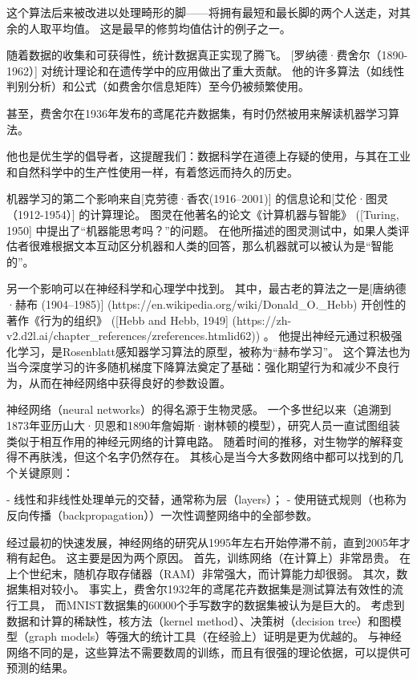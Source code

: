 这个算法后来被改进以处理畸形的脚——将拥有最短和最长脚的两个人送走，对其余的人取平均值。 这是最早的修剪均值估计的例子之一。

随着数据的收集和可获得性，统计数据真正实现了腾飞。 [罗纳德·费舍尔（1890-1962）]
对统计理论和在遗传学中的应用做出了重大贡献。 他的许多算法（如线性判别分析）和公式（如费舍尔信息矩阵）至今仍被频繁使用。 

甚至，费舍尔在1936年发布的鸢尾花卉数据集，有时仍然被用来解读机器学习算法。 

他也是优生学的倡导者，这提醒我们：数据科学在道德上存疑的使用，与其在工业和自然科学中的生产性使用一样，有着悠远而持久的历史。

机器学习的第二个影响来自[克劳德·香农(1916–2001)] %
的信息论和[艾伦·图灵（1912-1954）] %
的计算理论。 图灵在他著名的论文《计算机器与智能》 ([Turing, 1950] %
中提出了“机器能思考吗？”的问题。 在他所描述的图灵测试中，如果人类评估者很难根据文本互动区分机器和人类的回答，那么机器就可以被认为是“智能的”。

另一个影响可以在神经科学和心理学中找到。 其中，最古老的算法之一是[唐纳德·赫布 (1904–1985)]
(https://en.wikipedia.org/wiki/Donald\_O.\_Hebb)
开创性的著作《行为的组织》 ([Hebb and Hebb, 1949]
(https://zh-v2.d2l.ai/chapter\_references/zreferences.htmlid62)) 。
他提出神经元通过积极强化学习，是Rosenblatt感知器学习算法的原型，被称为“赫布学习”。 这个算法也为当今深度学习的许多随机梯度下降算法奠定了基础：强化期望行为和减少不良行为，从而在神经网络中获得良好的参数设置。

神经网络（neural networks）的得名源于生物灵感。 一个多世纪以来（追溯到1873年亚历山大·贝恩和1890年詹姆斯·谢林顿的模型），研究人员一直试图组装类似于相互作用的神经元网络的计算电路。 随着时间的推移，对生物学的解释变得不再肤浅，但这个名字仍然存在。 其核心是当今大多数网络中都可以找到的几个关键原则：

- 线性和非线性处理单元的交替，通常称为层（layers）；
- 使用链式规则（也称为反向传播（backpropagation））一次性调整网络中的全部参数。

经过最初的快速发展，神经网络的研究从1995年左右开始停滞不前，直到2005年才稍有起色。 这主要是因为两个原因。 首先，训练网络（在计算上）非常昂贵。 在上个世纪末，随机存取存储器（RAM）非常强大，而计算能力却很弱。 其次，数据集相对较小。 事实上，费舍尔1932年的鸢尾花卉数据集是测试算法有效性的流行工具， 而MNIST数据集的60000个手写数字的数据集被认为是巨大的。 考虑到数据和计算的稀缺性，核方法（kernel method）、决策树（decision tree）和图模型（graph models）等强大的统计工具（在经验上）证明是更为优越的。 与神经网络不同的是，这些算法不需要数周的训练，而且有很强的理论依据，可以提供可预测的结果。

